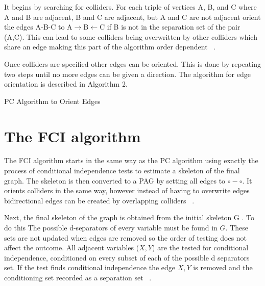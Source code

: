 \documentclass{UoYCSproject}
\begin{document}
It begins by searching for colliders. For each triple of vertices A, B, and C where A and B are adjacent, B and C are adjacent, but A and C are not adjacent orient the edges A-B-C to A$\rightarrow$B$\leftarrow$C if B is not in the separation set of the pair (A,C). This can lead to some colliders being overwritten by other colliders which share an edge making this part of the algorithm order dependent ~\parencite{spirtes1991algorithm}.

Once colliders are specified other edges can be oriented. This is done by repeating two steps until no more edges can be given a direction. The algorithm for edge orientation is described in Algorithm 2.\\


\begin{algorithm}[H]
	\DontPrintSemicolon
	
	
	\caption{PC Algorithm to Orient Edges ~\parencite{spirtes1991algorithm}}
\end{algorithm}

\section{The FCI algorithm}

The FCI algorithm starts in the same way as the PC algorithm using exactly the process of conditional independence tests to estimate a skeleton of the final graph. The skeleton is then converted to a PAG by setting all edges to $\circ-\circ$. It orients colliders in the same way, however instead of having to overwrite edges bidirectional edges can be created by overlapping colliders ~\parencite{colombo2012learning2}.

Next, the final skeleton of the graph is obtained from the initial skeleton G . To do this The possible d-separators of every variable must be found in $ G $. These sets are not updated when edges are removed so the order of testing does not affect the outcome. All adjacent variables ($X,Y$) are the tested for conditional independence, conditioned on every subset of each of the possible d separators set. If the test finds conditional independence the edge $X,Y$ is removed and the conditioning set recorded as a separation set ~\parencite{colombo2012learning2}. 
\end{document}
